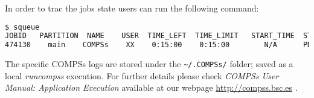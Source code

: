 In order to trac the jobs state users can run the following command:
\begin{lstlisting}[language=bash]
$ squeue  
JOBID   PARTITION  NAME    USER  TIME_LEFT  TIME_LIMIT   START_TIME  ST NODES  CPUS  NODELIST
474130    main    COMPSs    XX    0:15:00    0:15:00        N/A      PD    3   144   -  
\end{lstlisting}

The specific COMPSs logs are stored under the \verb|~/.COMPSs/| folder; saved as a local \textit{runcompss} execution. For further 
details please check \textit{COMPSs User Manual: Application Execution} available at our webpage \url{http://compss.bsc.es} .
